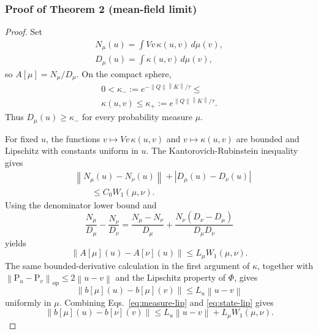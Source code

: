 \documentclass[11pt]{article}
\newcommand{\norm}[1]{\left\lVert #1 \right\rVert}
\newcommand{\Proj}{\mathrm{P}}
\begin{document}
\subsubsection{Proof of Theorem 2 (mean-field limit)}
\begin{proof}
Set
\begin{equation}
\begin{split}
N_\mu(u)=\int Vv\,\kappa(u,v)\,d\mu(v),
\\
D_\mu(u)=\int\kappa(u,v)\,d\mu(v),
\end{split}
\end{equation}
so $A[\mu]=N_\mu/D_\mu$. On the compact sphere,
\begin{equation}
\begin{split}
0<\kappa_-:=e^{-\norm Q\norm K/\tau}
\le\\\kappa(u,v)\le
\kappa_+:=e^{\norm Q\norm K/\tau}.
\end{split}
\end{equation}
Thus $D_\mu(u)\ge\kappa_-$ for every probability measure $\mu$.

For fixed $u$, the functions
$v\mapsto Vv\,\kappa(u,v)$ and $v\mapsto\kappa(u,v)$ are bounded and Lipschitz
with constants uniform in $u$. The Kantorovich-Rubinstein inequality gives
\begin{equation}
\begin{aligned}
&\norm{N_\mu(u)-N_\nu(u)}
 + |D_\mu(u)-D_\nu(u)|\\
&\qquad\le C_0W_1(\mu,\nu).
\end{aligned}
\end{equation}
Using the denominator lower bound and
\begin{equation}
\frac{N_\mu}{D_\mu}-\frac{N_\nu}{D_\nu}
=\frac{N_\mu-N_\nu}{D_\mu}
+\frac{N_\nu(D_\nu-D_\mu)}{D_\mu D_\nu}
\end{equation}
yields
\begin{equation}
\norm{A[\mu](u)-A[\nu](u)}\le L_\mu W_1(\mu,\nu).
\label{eq:measure-lip}
\end{equation}
The same bounded-derivative calculation in the first argument of $\kappa$,
together with
$\norm{\Proj_u-\Proj_v}_{\mathrm{op}}\le2\norm{u-v}$ and the Lipschitz property
of $\Phi$, gives
\begin{equation}
\norm{b[\mu](u)-b[\mu](v)}\le L_u\norm{u-v}
\label{eq:state-lip}
\end{equation}
uniformly in $\mu$.
Combining Eqs.~\eqref{eq:measure-lip} and \eqref{eq:state-lip} gives
\begin{equation}
\norm{b[\mu](u)-b[\nu](v)}
\le L_u\norm{u-v}+L_\mu W_1(\mu,\nu).
\label{eq:combined-lip}
\end{equation}


\end{proof}
\end{document}
